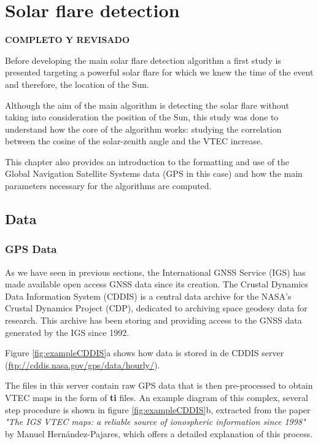 \chapter{Solar flare detection}\label{solarFlareChapter}

\textbf{COMPLETO Y REVISADO}

Before developing the main solar flare detection algorithm a first study is presented targeting a powerful solar flare for which we knew the time of the event and therefore, the location of the Sun.

Although the aim of the main algorithm is detecting the solar flare without taking into consideration the position of the Sun, this study was done to understand how the core of the algorithm works: studying the correlation between the cosine of the solar-zenith angle and the VTEC increase.

This chapter also provides an introduction to the formatting and use of the Global Navigation Satellite Systems data (GPS in this case) and how the main parameters necessary for the algorithms are computed.

\section{Data}

\subsection{GPS Data}

As we have seen in previous sections, the International GNSS Service (IGS) has made available open access GNSS data since its creation. The Crustal Dynamics Data Information System (CDDIS) is a central data archive for the NASA's Crustal Dynamics Project (CDP), dedicated to archiving space geodesy data for research. This archive has been storing and providing access to the GNSS data generated by the IGS since 1992.

Figure \ref{fig:exampleCDDIS}a shows how data is stored in de CDDIS server (\url{ftp://cddis.nasa.gov/gps/data/hourly/}).

The files in this server contain raw GPS data that is then pre-processed to obtain VTEC maps in the form of \textbf{ti} files. An example diagram of this complex, several step procedure is shown in figure \ref{fig:exampleCDDIS}b, extracted from the paper \textit{"The IGS VTEC maps: a reliable source of ionospheric information since 1998"} \cite{hernandez2009igs} by Manuel Hernández-Pajares, which offers a detailed explanation of this process. 

